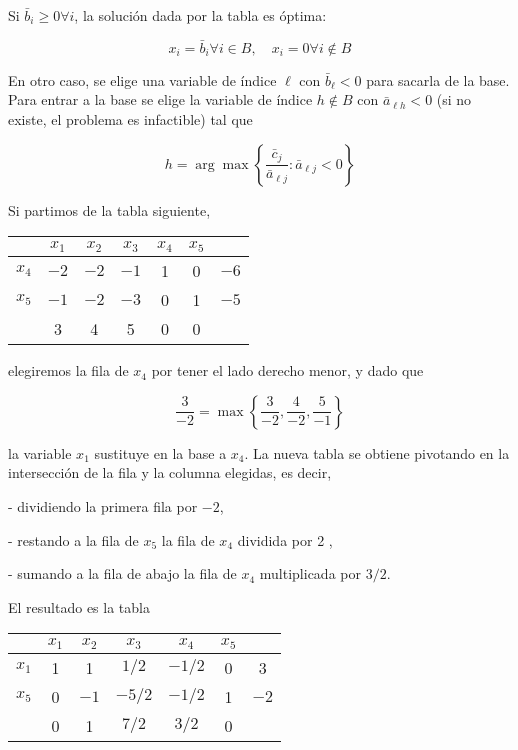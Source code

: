 \documentclass[openany]{book}
\begin{document}
Si $\bar{b}_{i} \geq 0 \forall i$, la solución dada por la tabla es óptima:

$$
x_{i}=\bar{b}_{i} \forall i \in B, \quad x_{i}=0 \forall i \notin B
$$

En otro caso, se elige una variable de índice $\ell$ con $\bar{b}_{\ell}<0$ para sacarla de la base. Para entrar a la base se elige la variable de índice $h \notin B$ con $\bar{a}_{\ell h}<0$ (si no existe, el problema es infactible) tal que

$$
h=\arg \max \left\{\frac{\bar{c}_{j}}{\bar{a}_{\ell j}}: \bar{a}_{\ell j}<0\right\}
$$

\begin{example}

  Si partimos de la tabla siguiente,

  \begin{tabular}{c|ccccc|c}
  \hline & $x_{1}$ & $x_{2}$ & $x_{3}$ & $x_{4}$ & $x_{5}$ & \\
  \hline$x_{4}$ & $-2$ & $-2$ & $-1$ & 1 & 0 & $-6$ \\
  $x_{5}$ & $-1$ & $-2$ & $-3$ & 0 & 1 & $-5$ \\
  \hline & 3 & 4 & 5 & 0 & 0 & \\
  \hline
  \end{tabular}

  elegiremos la fila de $x_{4}$ por tener el lado derecho menor, y dado que

  $$
  \frac{3}{-2}=\max \left\{\frac{3}{-2}, \frac{4}{-2}, \frac{5}{-1}\right\}
  $$

  la variable $x_{1}$ sustituye en la base a $x_{4}$. La nueva tabla se obtiene pivotando en la intersección de la fila y la columna elegidas, es decir,

  - dividiendo la primera fila por $-2$,

  - restando a la fila de $x_{5}$ la fila de $x_{4}$ dividida por 2 ,

  - sumando a la fila de abajo la fila de $x_{4}$ multiplicada por $3 / 2$.

  El resultado es la tabla

  \begin{tabular}{c|ccccc|c}
  \hline & $x_{1}$ & $x_{2}$ & $x_{3}$ & $x_{4}$ & $x_{5}$ & \\
  \hline$x_{1}$ & 1 & 1 & $1 / 2$ & $-1 / 2$ & 0 & 3 \\
  $x_{5}$ & 0 & $-1$ & $-5 / 2$ & $-1 / 2$ & 1 & $-2$ \\
  \hline & 0 & 1 & $7 / 2$ & $3 / 2$ & 0 & \\
  \hline
  \end{tabular}


\end{example}
\end{document}
